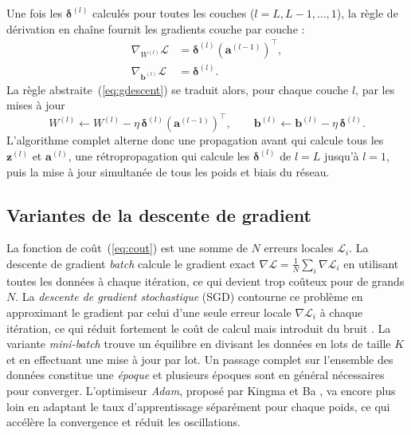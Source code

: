\documentclass[a4paper,french]{style-LaTeX}
\begin{document}
Une fois les $\boldsymbol{\delta}^{(l)}$ calculés pour toutes les couches ($l = L, L-1, \ldots, 1$), la règle de dérivation en chaîne fournit les gradients couche par couche :
\begin{align}
  \nabla_{W^{(l)}} \mathcal{L} &= \boldsymbol{\delta}^{(l)} \left(\mathbf{a}^{(l-1)}\right)^\top, \\
  \nabla_{\mathbf{b}^{(l)}} \mathcal{L} &= \boldsymbol{\delta}^{(l)}.
\end{align}
La règle abstraite~(\ref{eq:gdescent}) se traduit alors, pour chaque couche $l$, par les mises à jour
\begin{equation}
  W^{(l)} \leftarrow W^{(l)} - \eta\, \boldsymbol{\delta}^{(l)} \left(\mathbf{a}^{(l-1)}\right)^\top, \qquad
  \mathbf{b}^{(l)} \leftarrow \mathbf{b}^{(l)} - \eta\, \boldsymbol{\delta}^{(l)}.
  \label{eq:update}
\end{equation}
L'algorithme complet alterne donc une propagation avant qui calcule tous les $\mathbf{z}^{(l)}$ et $\mathbf{a}^{(l)}$, une rétropropagation qui calcule les $\boldsymbol{\delta}^{(l)}$ de $l = L$ jusqu'à $l = 1$, puis la mise à jour simultanée de tous les poids et biais du réseau.

\subsection*{Variantes de la descente de gradient}

La fonction de coût~(\ref{eq:cout}) est une somme de $N$ erreurs locales $\mathcal{L}_i$. La descente de gradient \emph{batch} calcule le gradient exact $\nabla\mathcal{L} = \frac{1}{N}\sum_i \nabla\mathcal{L}_i$ en utilisant toutes les données à chaque itération, ce qui devient trop coûteux pour de grands $N$. La \emph{descente de gradient stochastique} (SGD) contourne ce problème en approximant le gradient par celui d'une seule erreur locale $\nabla\mathcal{L}_i$ à chaque itération, ce qui réduit fortement le coût de calcul mais introduit du bruit \cite{Exo7deepmath}. La variante \emph{mini-batch} trouve un équilibre en divisant les données en lots de taille $K$ et en effectuant une mise à jour par lot. Un passage complet sur l'ensemble des données constitue une \emph{époque} et plusieurs époques sont en général nécessaires pour converger. L'optimiseur \emph{Adam}, proposé par Kingma et Ba \cite{Kingma14}, va encore plus loin en adaptant le taux d'apprentissage séparément pour chaque poids, ce qui accélère la convergence et réduit les oscillations.
\end{document}
